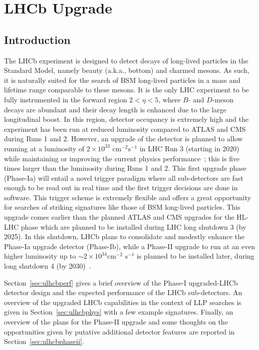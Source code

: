 \section{LHCb Upgrade}\label{sec:LHCb_upgrade}
\subsection{Introduction}

The LHCb experiment is designed to detect decays of long-lived particles in the Standard Model, namely beauty (a.k.a., bottom) and charmed mesons. As such, it is naturally suited for the search of BSM long-lived particles in a mass and lifetime range comparable to these mesons. It is the only LHC experiment to be fully instrumented in the forward region $2<\eta<5$, where $B$- and $D$-meson decays are abundant and their decay length is enhanced due to the large longitudinal boost. In this region, detector occupancy is extremely high and the experiment has been run at reduced luminosity compared to ATLAS and CMS during Runs 1 and 2. However, an upgrade of the detector is planned to allow running at a luminosity of $2\times 10^{33}\,\,\text{cm}^{-2}\text{s}^{-1}$ in LHC Run 3 (starting in 2020) while maintaining or improving the current physics performance~\cite{LHCbUpgradeTDR}; this is five times larger than the luminosity during Runs 1 and 2. This first upgrade phase (Phase-Ia) will entail a novel trigger paradigm where all sub-detectors are fast enough to be read out in real time and the first trigger decisions are done in software. This trigger scheme is extremely flexible and offers a great opportunity for searches of striking signatures like those of BSM long-lived particles. This upgrade comes earlier than the planned ATLAS and CMS upgrades for the HL-LHC phase which are planned to be installed during LHC long shutdown 3 (by 2025). In this shutdown, LHCb plans to consolidate and modestly enhance the Phase-Ia upgrade detector (Phase-Ib), while a Phase-II upgrade to run at an even higher luminosity up to $\sim 2\times 10^{34}\text{cm}^{-2}\,\,\text{s}^{-1}$ is planned to be installed later, during long shutdown 4 (by 2030)~\cite{LHCbUpgradeIIPC}.

Section~\ref{sec:ulhcbperf} gives a brief overview of the Phase-I upgraded-LHCb detector design and the expected performance of the LHCb sub-detectors. An overview of the upgraded LHCb capabilities in the context of LLP searches is given in Section~\ref{sec:ulhcbphys} with a few example signatures. Finally, an overview of the plans for the Phase-II upgrade and some thoughts on the opportunities given by putative additional detector features are reported in Section~\ref{sec:ulhcbphaseii}.

